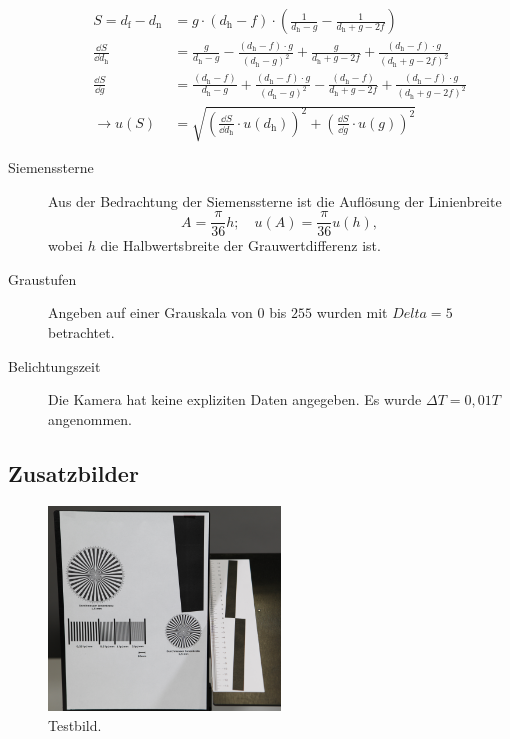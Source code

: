 \begin{description}
		\begin{align}
			S = d_\text{f} - d_\text{n} &= g\cdot (d_\text{h}-f) \cdot \left( \frac{1}{d_\text{h} - g} - \frac{1}{d_\text{h} + g -2f} \right) \\
			\frac{\dd S}{\dd d_\text{h}} &= \frac{g}{d_\text{h} - g} - \frac{(d_\text{h} - f)\cdot g}{(d_\text{h} - g)^2} + \frac{g}{d_\text{h} + g - 2f} + \frac{(d_\text{h} - f)\cdot g}{(d_\text{h} + g - 2f)^2} \\
			\frac{\dd S}{\dd g} &= \frac{(d_\text{h} - f)}{d_\text{h} - g} + \frac{(d_\text{h} - f)\cdot g}{(d_\text{h} - g)^2} - \frac{(d_\text{h} - f)}{d_\text{h} + g - 2f} + \frac{(d_\text{h} - f)\cdot g}{(d_\text{h} + g - 2f)^2} \\
			\rightarrow u(S) &= \sqrt{\left( \frac{\dd S}{\dd d_\text{h}} \cdot u(d_\text{h}) \right)^2 + \left( \frac{\dd S}{\dd g} \cdot u(g) \right)^2 }
		\end{align}
	
		\item[Siemenssterne] Aus der Bedrachtung der Siemenssterne ist die Auflösung der Linienbreite 
		\begin{equation}
			A = \frac{\pi }{36} h; \quad u(A) = \frac{\pi}{36} u(h),
		\end{equation}
		wobei $h$ die Halbwertsbreite der Grauwertdifferenz ist.
		
		\item[Graustufen] Angeben auf einer Grauskala von $0$ bis $255$ wurden mit $Delta = 5$ betrachtet.
		
		\item[Belichtungszeit] Die Kamera hat keine expliziten Daten angegeben.
		Es wurde $\Delta T = 0,01 T$ angenommen.
		
	\end{description}

\newpage
\subsection{Zusatzbilder}\label{subsec:Zusatz}

\begin{figure}[ht]
	\centering
	\includegraphics[width=0.55\textwidth]{bilder/testbild.png}
	\caption{Testbild.\cite{WWU}}
	\label{fig:testbild}	
\end{figure}	


